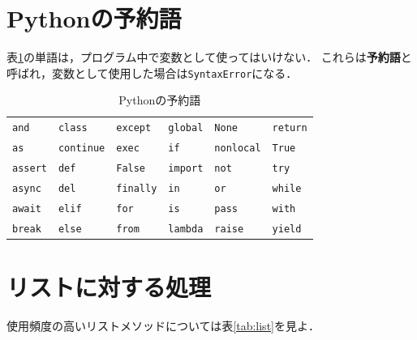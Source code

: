 \documentclass[a4paper,12pt]{jsarticle}
\begin{document}
\section{Pythonの予約語}

表\ref{tab:out_of_use}の単語は，プログラム中で変数として使ってはいけない．
これらは{\bf 予約語}と呼ばれ，変数として使用した場合は\texttt{SyntaxError}になる．

\begin{table}[H]
    \centering
    \caption{Pythonの予約語}
    \begin{tabular}{llllll}
        \hline
        \texttt{and} & \texttt{class} & \texttt{except} & \texttt{global} & \texttt{None} & \texttt{return} \\
        \texttt{as} & \texttt{continue} & \texttt{exec} & \texttt{if} & \texttt{nonlocal} & \texttt{True} \\
        \texttt{assert} & \texttt{def} & \texttt{False} & \texttt{import} & \texttt{not} & \texttt{try} \\
        \texttt{async} & \texttt{del} & \texttt{finally} & \texttt{in} & \texttt{or} & \texttt{while} \\
        \texttt{await} & \texttt{elif} & \texttt{for} & \texttt{is} & \texttt{pass} & \texttt{with} \\
        \texttt{break} & \texttt{else} & \texttt{from} & \texttt{lambda} & \texttt{raise} & \texttt{yield} \\
        \hline
    \end{tabular}
    \label{tab:out_of_use}
\end{table}

\section{リストに対する処理}

使用頻度の高いリストメソッドについては表\ref{tab:list}を見よ．
\end{document}

